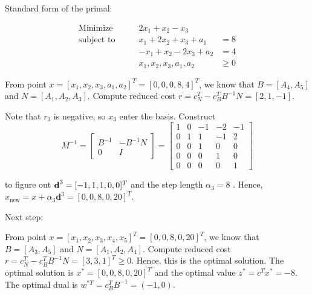 \documentclass[12pt]{article}
\begin{document}
Standard form of the primal:

$$
\begin{aligned}
\text{Minimize} \qquad & 2x_1 + x_2 - x_3 &  \\
\text{subject\  to} \qquad & x_1 + 2x_2 + x_3 + a_1 & = 8\\
 & -x_1 + x_2 -2x_3 + a_2 & = 4 \\
 & x_1, x_2, x_3, a_1, a_2 & \geqslant 0
\end{aligned}
$$ 



From point $x = [x_1, x_2, x_3, a_1, a_2]^T = [0, 0, 0, 8, 4]^T$, we know that $B = [A_4, A_5]$ and $N = [A_1, A_2, A_3]$. Compute reduced cost $r = c_N^T - c_B^TB^{-1}N = [2, 1, -1]$.

Note that $r_3$ is negative, so $x_3$ enter the basis. Construct $$
M^{-1} = \begin{bmatrix}
B^{-1} & -B^{-1}N \\
 0 & I
\end{bmatrix} = \begin{bmatrix}
1 & 0 & -1 & -2 & -1 \\
0 & 1 & 1 & -1 & 2 \\
0 & 0 & 1 & 0 & 0 \\
0 & 0 & 0 & 1 & 0 \\
0 & 0 & 0 & 0 & 1
\end{bmatrix}
$$ 

to figure out $\textbf d^3 = [-1, 1, 1, 0, 0]^T$  and the step length $\alpha_3 = 8$ . Hence, $x_{\text{new}} = x + \alpha_3\textbf{d}^3 = [0, 0, 8, 0, 20]^T$. 

Next step:

From point $x = [x_1, x_2, x_3, x_4, x_5]^T = [0, 0, 8, 0, 20]^T$, we know that $B = [A_3, A_5]$ and $N = [A_1, A_2, A_4]$. Compute reduced cost $r = c_N^T - c_B^TB^{-1}N = [3,3,1]^T \geqslant 0$. Hence, this is the optimal solution. The optimal solution is $x^* = [0, 0, 8, 0, 20]^T$ and the optimal value $z^* = c^Tx^* = -8 $. The optimal dual is $w^{*T} = c^T_BB^{-1} = (-1, 0)$.
\end{document}
